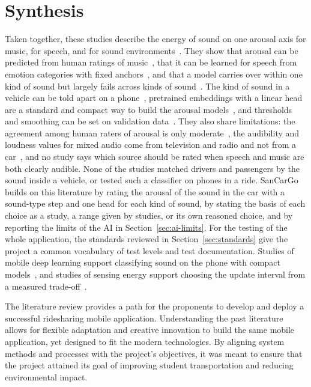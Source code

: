 \section{Synthesis}
Taken together, these studies describe the energy of sound on one arousal axis for music, for speech, and for sound environments~\cite{russell1980circumplex,russell1980environments,axelsson2010principal,coutinho2014transfer,simonetta2024joint}. They show that arousal can be predicted from human ratings of music~\cite{aljanaki2017deam,zhang2018pmemo,sun2023segmented}, that it can be learned for speech from emotion categories with fixed anchors~\cite{zhou2023arousal}, and that a model carries over within one kind of sound but largely fails across kinds of sound~\cite{zhang2026generalisation}. The kind of sound in a vehicle can be told apart on a phone~\cite{won2017adaptive}, pretrained embeddings with a linear head are a standard and compact way to build the arousal models~\cite{phukan2023embeddings,niizumi2023byola,koh2021embeddings}, and thresholds and smoothing can be set on validation data~\cite{cances2019postprocessing}. They also share limitations: the agreement among human raters of arousal is only moderate~\cite{aljanaki2017deam,hu2008mirex,gomez2019emotions}, the audibility and loudness values for mixed audio come from television and radio and not from a car~\cite{batlleroca2023background,venkatesh2021synthesising}, and no study says which source should be rated when speech and music are both clearly audible. None of the studies matched drivers and passengers by the sound inside a vehicle, or tested such a classifier on phones in a ride. SanCarGo builds on this literature by rating the arousal of the sound in the car with a sound-type step and one head for each kind of sound, by stating the basis of each choice as a study, a range given by studies, or its own reasoned choice, and by reporting the limits of the AI in Section~\ref{sec:ai-limits}. For the testing of the whole application, the standards reviewed in Section~\ref{sec:standards} give the project a common vocabulary of test levels and test documentation. Studies of mobile deep learning support classifying sound on the phone with compact models~\cite{zhao2022survey,lane2015deep}, and studies of sensing energy support choosing the update interval from a measured trade-off~\cite{janko2021energy,georgiev2014dspear}.

The literature review provides a path for the proponents to develop and deploy a successful ridesharing mobile application. Understanding the past literature allows for flexible adaptation and creative innovation to build the same mobile application, yet designed to fit the modern technologies. By aligning system methods and processes with the project’s objectives, it was meant to ensure that the project attained its goal of improving student transportation and reducing environmental impact.

